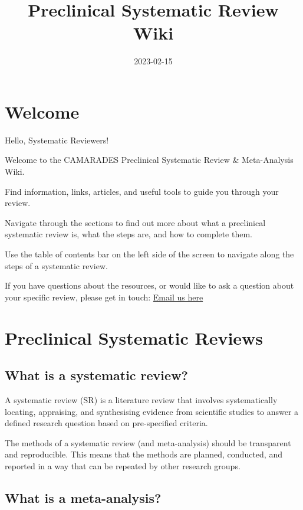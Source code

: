 \documentclass[
]{book}
\title{Preclinical Systematic Review Wiki}
\author{}
\date{\vspace{-2.5em}2023-02-15}
\begin{document}
\maketitle

{
\setcounter{tocdepth}{1}
\tableofcontents
}
\hypertarget{welcome}{%
\chapter{Welcome}\label{welcome}}

Hello, Systematic Reviewers!

Welcome to the CAMARADES Preclinical Systematic Review \& Meta-Analysis Wiki.

Find information, links, articles, and useful tools to guide you through your review.

Navigate through the sections to find out more about what a preclinical systematic review is, what the steps are, and how to complete them.

Use the table of contents bar on the left side of the screen to navigate along the steps of a systematic review.

If you have questions about the resources, or would like to ask a question about your specific review, please get in touch:
\href{mailto:CAMARADES.berlin@charite.de}{Email us here}

\hypertarget{intro}{%
\chapter{Preclinical Systematic Reviews}\label{intro}}

\hypertarget{what-is-a-systematic-review}{%
\section{What is a systematic review?}\label{what-is-a-systematic-review}}

A systematic review (SR) is a literature review that involves systematically locating, appraising, and synthesising evidence from scientific studies to answer a defined research question based on pre-specified criteria.

The methods of a systematic review (and meta-analysis) should be transparent and reproducible. This means that the methods are planned, conducted, and reported in a way that can be repeated by other research groups.

\hypertarget{what-is-a-meta-analysis}{%
\section{What is a meta-analysis?}\label{what-is-a-meta-analysis}}
\end{document}
